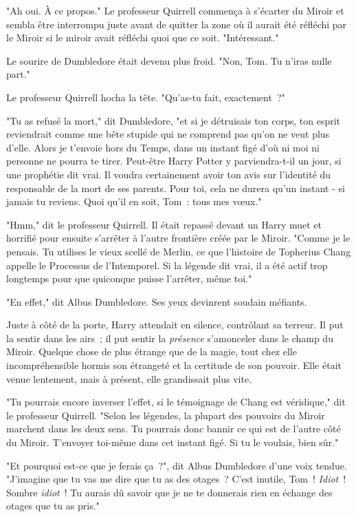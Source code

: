 "Ah oui. À ce propos." Le professeur Quirrell commença à s'écarter du Miroir et sembla être interrompu juste avant de quitter la zone où il aurait été réfléchi par le Miroir si le miroir avait réfléchi quoi que ce soit. "Intéressant."

Le sourire de Dumbledore était devenu plus froid. "Non, Tom. Tu n'iras nulle part."

Le professeur Quirrell hocha la tête. "Qu'as-tu fait, exactement~?"

"Tu as refusé la mort," dit Dumbledore, "et si je détruisais ton corps, ton esprit reviendrait comme une bête stupide qui ne comprend pas qu'on ne veut plus d'elle. Alors je t'envoie hors du Temps, dans un instant figé d'où ni moi ni personne ne pourra te tirer. Peut-être Harry Potter y parviendra-t-il un jour, si une prophétie dit vrai. Il voudra certainement avoir ton avis sur l'identité du responsable de la mort de ses parents. Pour toi, cela ne durera qu'un instant - si jamais tu reviens. Quoi qu'il en soit, Tom~: tous mes vœux."

"Hmm," dit le professeur Quirrell. Il était repassé devant un Harry muet et horrifié pour ensuite s'arrêter à l'autre frontière créée par le Miroir. "Comme je le pensais. Tu utilises le vieux scellé de Merlin, ce que l'histoire de Topherius Chang appelle le Processus de l'Intemporel. Si la légende dit vrai, il a été actif trop longtemps pour que quiconque puisse l'arrêter, même toi."

"En effet," dit Albus Dumbledore. Ses yeux devinrent soudain méfiants.

Juste à côté de la porte, Harry attendait en silence, contrôlant sa terreur. Il put la sentir dans les airs~; il put sentir la \emph{présence} s'amonceler dans le champ du Miroir. Quelque chose de plus étrange que de la magie, tout chez elle incompréhensible hormis son étrangeté et la certitude de son pouvoir. Elle était venue lentement, mais à présent, elle grandissait plus vite.

"Tu pourrais encore inverser l'effet, si le témoignage de Chang est véridique," dit le professeur Quirrell. "Selon les légendes, la plupart des pouvoirs du Miroir marchent dans les deux sens. Tu pourrais donc bannir ce qui est de l'autre côté du Miroir. T'envoyer toi-même dans cet instant figé. Si tu le voulais, bien sûr."

"Et pourquoi est-ce que je ferais ça~?", dit Albus Dumbledore d'une voix tendue. "J'imagine que tu vas me dire que tu as des otages~? C'est inutile, Tom~! \emph{Idiot}~! Sombre \emph{idiot}~! Tu aurais dû savoir que je ne te donnerais rien en échange des otages que tu as pris."

